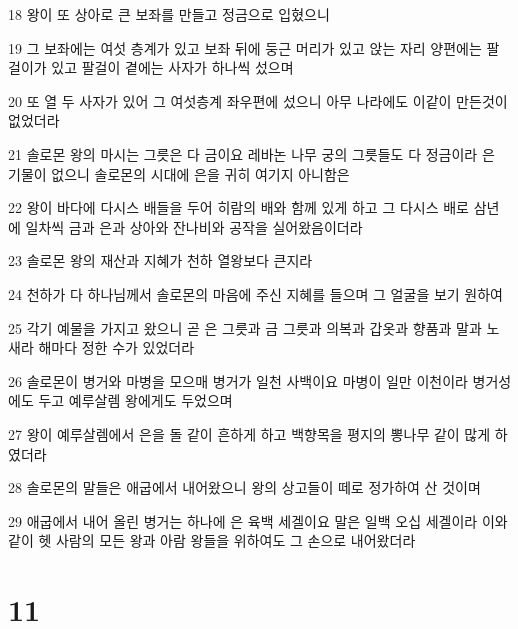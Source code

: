 \par 18 왕이 또 상아로 큰 보좌를 만들고 정금으로 입혔으니
\par 19 그 보좌에는 여섯 층계가 있고 보좌 뒤에 둥근 머리가 있고 앉는 자리 양편에는 팔걸이가 있고 팔걸이 곁에는 사자가 하나씩 섰으며
\par 20 또 열 두 사자가 있어 그 여섯층계 좌우편에 섰으니 아무 나라에도 이같이 만든것이 없었더라
\par 21 솔로몬 왕의 마시는 그릇은 다 금이요 레바논 나무 궁의 그릇들도 다 정금이라 은 기물이 없으니 솔로몬의 시대에 은을 귀히 여기지 아니함은
\par 22 왕이 바다에 다시스 배들을 두어 히람의 배와 함께 있게 하고 그 다시스 배로 삼년에 일차씩 금과 은과 상아와 잔나비와 공작을 실어왔음이더라
\par 23 솔로몬 왕의 재산과 지혜가 천하 열왕보다 큰지라
\par 24 천하가 다 하나님께서 솔로몬의 마음에 주신 지혜를 들으며 그 얼굴을 보기 원하여
\par 25 각기 예물을 가지고 왔으니 곧 은 그릇과 금 그릇과 의복과 갑옷과 향품과 말과 노새라 해마다 정한 수가 있었더라
\par 26 솔로몬이 병거와 마병을 모으매 병거가 일천 사백이요 마병이 일만 이천이라 병거성에도 두고 예루살렘 왕에게도 두었으며
\par 27 왕이 예루살렘에서 은을 돌 같이 흔하게 하고 백향목을 평지의 뽕나무 같이 많게 하였더라
\par 28 솔로몬의 말들은 애굽에서 내어왔으니 왕의 상고들이 떼로 정가하여 산 것이며
\par 29 애굽에서 내어 올린 병거는 하나에 은 육백 세겔이요 말은 일백 오십 세겔이라 이와 같이 헷 사람의 모든 왕과 아람 왕들을 위하여도 그 손으로 내어왔더라

\chapter{11}

